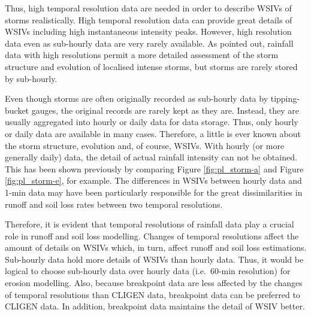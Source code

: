 
Thus, high temporal resolution data are needed in order to describe WSIVs of
storms realistically. High temporal resolution data can provide great details of
WSIVs including high instantaneous intensity peaks. However, high resolution
data even as sub-hourly data are very rarely available.
As \citet{allott2002-73} pointed out, rainfall data with high resolutions permit
a more detailed assessment of the storm structure and evolution of localised
intense storms, but storms are rarely stored by sub-hourly.

Even though storms are often originally recorded as sub-hourly data by
tipping-bucket gauges, the original records are rarely kept as they are.
Instead, they are usually aggregated into hourly or daily data for data storage.
Thus, only hourly or daily data are available in many cases.
Therefore, a little is ever known about the storm structure, evolution and, of
course, WSIVs. With hourly (or more generally daily) data, the detail of
actual rainfall intensity can not be obtained. This has been shown
previously by comparing Figure \ref{fig:pl_storm-a} and Figure
\ref{fig:pl_storm-e}, for example. The differences in WSIVs between hourly data
and 1-min data may have been particularly responsible for the great
dissimilarities in runoff and soil loss rates between two temporal resolutions.

Therefore, it is evident that temporal resolutions of rainfall data play a
crucial role in runoff and soil loss modelling. Changes of temporal resolutions
affect the amount of details on WSIVs which, in turn, affect runoff and soil
loss estimations.
Sub-hourly data hold more details of WSIVs than hourly data. Thus, it would be
logical to choose sub-hourly data over hourly data (i.e.\ 60-min resolution) for
erosion modelling. Also, because breakpoint data are less affected by the
changes of temporal resolutions than CLIGEN data, breakpoint data can be
preferred to CLIGEN data. In addition, breakpoint data maintains the detail of
WSIV better.

